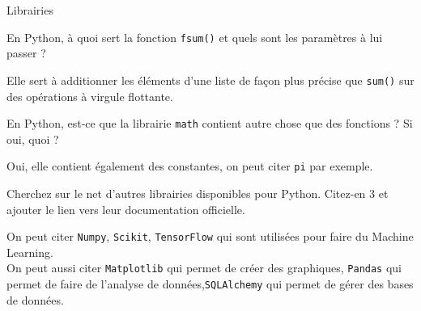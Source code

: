 \begin{section}{Librairies}
\begin{solution}
    
\end{solution} 
\begin{Exercice}[3 minutes]
	En Python, à quoi sert la fonction \lstinline{fsum()} et quels sont les paramètres à lui passer ? 
\end{Exercice}
\begin{solution}
	Elle sert à additionner les éléments d'une liste de façon plus précise que \lstinline{sum()} sur des opérations à virgule flottante.
\end{solution} 

\begin{Exercice}[3 minutes]
	En Python, est-ce que la librairie \lstinline{math} contient autre chose que des fonctions ? Si oui, quoi ? 
\end{Exercice} 
\begin{solution}
	Oui, elle contient également des constantes, on peut citer \lstinline{pi} par exemple.
\end{solution} 
\begin{Exercice}[10 minutes]
	Cherchez sur le net d'autres librairies disponibles pour Python. Citez-en 3 et ajouter le lien vers leur documentation officielle.
\end{Exercice}    
\begin{solution}
	On peut citer \lstinline{Numpy}, \lstinline{Scikit}, \lstinline{TensorFlow} qui sont utilisées pour faire du Machine Learning. \\
	
	On peut aussi citer \lstinline{Matplotlib} qui permet de créer des graphiques, \texttt{Pandas} qui permet de faire de l'analyse de données,\lstinline{SQLAlchemy} qui permet de gérer des bases de données. \\
\end{solution} 
\end{section}

